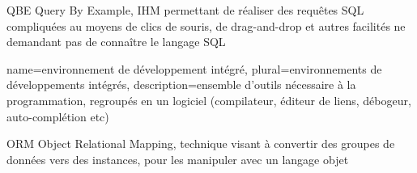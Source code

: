         {QBE}
        {Query By Example, IHM permettant de réaliser des requêtes SQL compliquées au moyens de clics de souris, de drag-and-drop et autres
        facilités ne demandant pas de connaître le langage SQL}
		
		{name={environnement de développement intégré},
		plural={environnements de développements intégrés},
		description={ensemble d'outils nécessaire à la programmation, regroupés en un logiciel (compilateur, éditeur de liens, débogeur, auto-complétion etc)}}

        {ORM}
        {Object Relational Mapping, technique visant à convertir des groupes de données vers des instances, pour les manipuler avec un langage objet}
